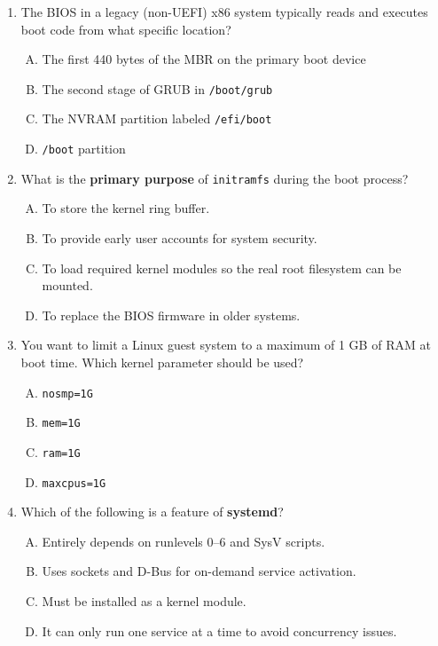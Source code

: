 \documentclass[12pt,a4paper]{report}
\begin{document}
\begin{enumerate}[1.]
    \item The BIOS in a legacy (non-UEFI) x86 system typically reads and executes boot code from what specific location?
      \begin{enumerate}[A)]
        \item The first 440 bytes of the MBR on the primary boot device
        \item The second stage of GRUB in \texttt{/boot/grub}
        \item The NVRAM partition labeled \texttt{/efi/boot}
        \item \texttt{/boot} partition
      \end{enumerate}
    
    \item What is the \textbf{primary purpose} of \texttt{initramfs} during the boot process?
      \begin{enumerate}[A)]
        \item To store the kernel ring buffer.
        \item To provide early user accounts for system security.
        \item To load required kernel modules so the real root filesystem can be mounted.
        \item To replace the BIOS firmware in older systems.
      \end{enumerate}
    
    \item You want to limit a Linux guest system to a maximum of 1 GB of RAM at boot time. Which kernel parameter should be used?
      \begin{enumerate}[A)]
        \item \texttt{nosmp=1G}
        \item \texttt{mem=1G}
        \item \texttt{ram=1G}
        \item \texttt{maxcpus=1G}
      \end{enumerate}
    
    \item Which of the following is a feature of \textbf{systemd}?
      \begin{enumerate}[A)]
        \item Entirely depends on runlevels 0–6 and SysV scripts.
        \item Uses sockets and D-Bus for on-demand service activation.
        \item Must be installed as a kernel module.
        \item It can only run one service at a time to avoid concurrency issues.
      \end{enumerate}
    

\end{enumerate}
\end{document}
